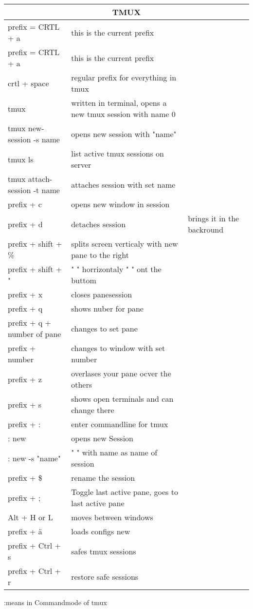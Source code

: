 \documentclass[12pt]{article}
\begin{document}
\begin{tabular}{| p{6.5cm} | p{6.5cm} | p{6.5cm} |}
    \hline
    \multicolumn{3}{|c|}{TMUX} \\
    \hline
    prefix = CRTL + a & this is the current prefix &\\
    \hline
    prefix = CRTL + a & this is the current prefix &\\
    \hline
    crtl + space & regular prefix for everything in tmux & \\
    \hline
    tmux & written in terminal, opens a new tmux session with name 0 & \\
    \hline
    tmux new-session -s name & opens new session with "name" & \\
    \hline 
    tmux ls & list active tmux sessions on server & \\
    \hline
    tmux attach-session -t name & attaches session with set name & \\
    \hline 
    prefix + c & opens new window in session & \\
    \hline
    prefix + d & detaches session & brings it in the backround \\
    \hline
    prefix + shift + \% & splits screen verticaly with new pane to the right & \\
    \hline
    prefix + shift + " & " " horrizontaly " " ont the buttom & \\
    \hline 
    prefix + x & closes pane\/session & \\
    \hline 
    prefix + q & shows nuber for pane & \\
    \hline 
    prefix + q + number of pane & changes to set pane & \\
    \hline
    prefix + number & changes to window with set number & \\
    \hline
    prefix + z & overlases your pane ocver the others & \\
    \hline
    prefix + s & shows open terminals and can change there & \\
    \hline
    prefix + : & enter commandline for tmux & \\
    \hline
    : new & opens new Session & \\
    \hline
    : new -s "name" & " " with name as name of session & \\
    \hline
    prefix + \$ & rename the session & \\
    \hline
    prefix + ; & Toggle last active pane, goes to last active pane &\\
    \hline
    Alt + H or L & moves between windows & \\
    \hline 
    prefix + ä & loads configs new & \\
    \hline
    prefix + Ctrl + s & safes tmux sessions & \\
    \hline 
    prefix + Ctrl + r & restore safe sessions & \\
        \hline
\end{tabular}
 :means in Commandmode of tmux
\newpage
\end{document}
